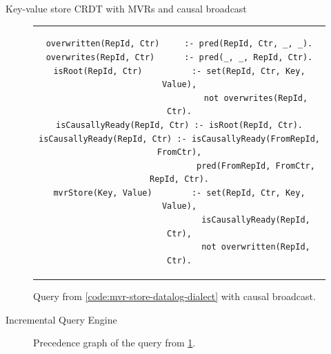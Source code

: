 \documentclass[USenglish,aspectratio=169]{beamer} %
\begin{document}
\begin{frame}[fragile]{Key-value store \acs{CRDT} with \acsp{MVR} and causal broadcast}
    \begin{figure}[h]
        \begin{tabular}{c}
        \begin{lstlisting}[keepspaces]
overwritten(RepId, Ctr)     :- pred(RepId, Ctr, _, _).
overwrites(RepId, Ctr)      :- pred(_, _, RepId, Ctr).
isRoot(RepId, Ctr)          :- set(RepId, Ctr, Key, Value),
                               not overwrites(RepId, Ctr).
isCausallyReady(RepId, Ctr) :- isRoot(RepId, Ctr).
isCausallyReady(RepId, Ctr) :- isCausallyReady(FromRepId, FromCtr),
                               pred(FromRepId, FromCtr, RepId, Ctr).
mvrStore(Key, Value)        :- set(RepId, Ctr, Key, Value),
                               isCausallyReady(RepId, Ctr),
                               not overwritten(RepId, Ctr).\end{lstlisting}
        \end{tabular}
        \caption{Query from \ref{code:mvr-store-datalog-dialect} with causal broadcast.}\label{code:mvr-crdt-datalog-dialect}
    \end{figure}
\end{frame}

\begin{frame}{Incremental Query Engine}
    \begin{figure}
        \centering
        
        \caption{Precedence graph of the query from \ref{code:mvr-crdt-datalog-dialect}.}
    \end{figure}
\end{frame}
\end{document}
